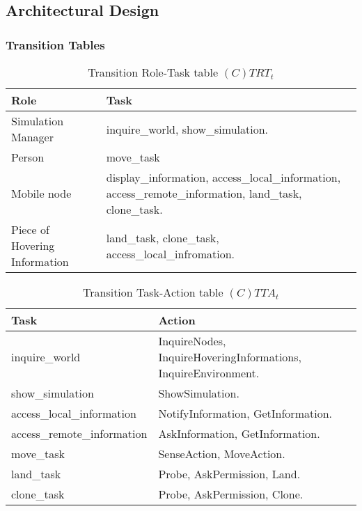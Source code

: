 \subsection{Architectural Design}

\subsubsection{Transition Tables}

\begin{table}[H]
	\centering
	\begin{tabular}{|p{4cm}|p{8cm}|}
			\hline
			\textbf{Role} & \textbf{Task} \\
			\hline
      Simulation Manager & inquire\_world, show\_simulation.   \\
			\hline
			Person & move\_task \\
			\hline
      Mobile node & display\_information, access\_local\_information,
                    access\_remote\_information, land\_task, clone\_task. \\
			\hline
			Piece of Hovering Information & land\_task, clone\_task, access\_local\_infromation. \\
			\hline
		\end{tabular}
	\caption{Transition Role-Task table $(C)TRT_t$}
	\label{tab:ctrtt}
\end{table}

\begin{table}[H]
	\centering
	\begin{tabular}{|p{4cm}|p{8cm}|}
			\hline
			\textbf{Task} & \textbf{Action} \\
			\hline
			inquire\_world & InquireNodes, InquireHoveringInformations, InquireEnvironment. \\
			\hline
			show\_simulation & ShowSimulation. \\
			\hline
			access\_local\_information & NotifyInformation, GetInformation.\\
			\hline
			access\_remote\_information & AskInformation, GetInformation.\\
			\hline
			move\_task & SenseAction, MoveAction. \\
			\hline
			land\_task & Probe, AskPermission, Land. \\
			\hline
			clone\_task & Probe, AskPermission, Clone. \\
			\hline
		\end{tabular}
	\caption{Transition Task-Action table $(C)TTA_t$}
	\label{tab:cttat}
\end{table}

